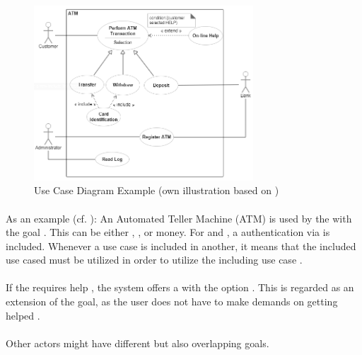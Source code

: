 \begin{figure}[H]
    \centering
    \includegraphics[width=0.73\textwidth]{img/ucEx.png}
    \caption[Use Case Diagram Example]{Use Case Diagram Example (own illustration based on \cite[641-644]{ObjectManagementGroup.01.03.2015})}\label{fig:ucEx}
\end{figure}

\paragraph{} As an example (cf. ): An Automated Teller Machine (ATM) is used by the  with the goal . This can be either , , or  money. For  and , a authentication via  is included. Whenever a use case is included in another, it means that the included use cased must be utilized in order to utilize the including use case \parencite[cf.][639]{ObjectManagementGroup.01.03.2015}. 

\paragraph{} If the  requires help , the system offers a  with the option . This is regarded as an extension of the goal, as the user does not have to make demands on getting helped \parencite[cf.][638-639]{ObjectManagementGroup.01.03.2015}.

\paragraph{} 
Other actors might have different but also overlapping goals.


